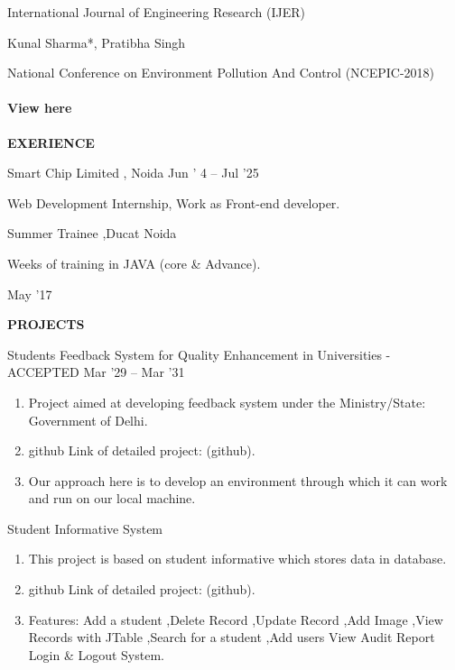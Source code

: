 \documentclass{article} %
\begin{document}
\noindent International Journal of Engineering Research  (IJER)

\noindent Kunal Sharma*, Pratibha Singh

\noindent National Conference on Environment Pollution And Control (NCEPIC-2018)

\noindent 
\paragraph{View here}

\noindent \textbf{EXERIENCE\underbar{  }}

\noindent  Smart Chip Limited , Noida Jun ' 4 -- Jul '25

\noindent  Web Development Internship, Work as Front-end developer.

\noindent     Summer Trainee ,Ducat Noida

 Weeks of training in JAVA (core \& Advance).

\noindent May '17

\noindent 

\noindent \textbf{PROJECTS}\underbar{  }

\noindent Students Feedback System for Quality Enhancement in Universities - ACCEPTED Mar '29 -- Mar '31

\begin{enumerate}
\item  Project aimed at developing feedback system under the Ministry/State: Government of Delhi.

\item  github Link of detailed project: (github).

\item  Our approach here is to develop an environment through which it can work and run on our local machine.
\end{enumerate}

\noindent Student Informative System

\begin{enumerate}
\item  This project is based on student informative which stores data in database.

\item  github Link of detailed project: (github).

\item  Features: Add a student ,Delete Record ,Update Record ,Add Image ,View Records with JTable ,Search for a student ,Add users View Audit Report Login \& Logout System.
\end{enumerate}
\end{document}

